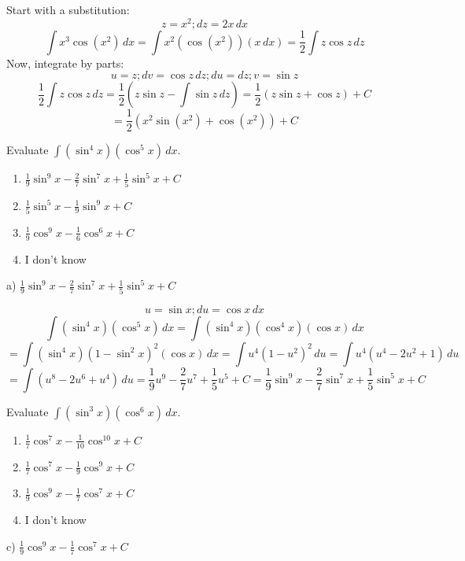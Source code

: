 \documentclass[addpoints,12pt,answers]{exam}
\begin{document}
\begin{questions}
\begin{solution}
    Start with a substitution:    
    $$z=x^2; dz=2x\,dx$$
    $$\int x^3\cos(x^2)\,dx=\int x^2(\cos (x^2))(x\,dx)=\frac{1}{2}\int z\cos z\,dz$$
    Now, integrate by parts:
    $$u=z; dv=\cos z\,dz; du=dz; v=\sin z$$
    $$\frac{1}{2}\int z\cos z\,dz=\frac{1}{2}\left(z\sin z-\int\sin z\,dz\right)=\frac{1}{2}(z\sin z+\cos z)+C$$
    $$=\frac{1}{2}\left(x^2\sin(x^2)+\cos(x^2)\right)+C$$
  \end{solution}
  \newpage
  \question
  Evaluate $\displaystyle\int(\sin^4 x)(\cos^5 x)\,dx$.
  \begin{enumerate}[label=\alph*)]
    \item
    $\displaystyle\frac{1}{9}\sin^9 x-\frac{2}{7}\sin^7 x+\frac{1}{5}\sin^5 x+C$
    \item
    $\displaystyle\frac{1}{5}\sin^5 x-\frac{1}{9}\sin^9 x+C$
    \item
    $\displaystyle\frac{1}{9}\cos^9 x-\frac{1}{6}\cos^6 x+C$
    \item
    I don't know
  \end{enumerate}
  \begin{solution}
    a) $\displaystyle\frac{1}{9}\sin^9 x-\frac{2}{7}\sin^7 x+\frac{1}{5}\sin^5 x+C$
    
    $$u=\sin x; du=\cos x\,dx$$
    $$\int(\sin^4 x)(\cos^5 x)\,dx=\int(\sin^4 x)(\cos^4 x)(\cos x)\,dx$$
    $$=\int(\sin^4 x)(1-\sin^2 x)^2(\cos x)\,dx=\int u^4(1-u^2)^2\,du=\int u^4(u^4-2u^2+1)\,du$$
    $$=\int(u^8-2u^6+u^4)\,du=\frac{1}{9}u^9-\frac{2}{7}u^7+\frac{1}{5}u^5+C=\frac{1}{9}\sin^9 x-\frac{2}{7}\sin^7 x+\frac{1}{5}\sin^5 x+C$$
  \end{solution}
  \newpage
  \question
  Evaluate $\displaystyle\int(\sin^3 x)(\cos^6 x)\,dx$.
  \begin{enumerate}[label=\alph*)]
    \item
    $\displaystyle\frac{1}{7}\cos^7 x-\frac{1}{10}\cos^{10}x+C$
    \item
    $\displaystyle\frac{1}{7}\cos^7 x-\frac{1}{9}\cos^9 x+C$
    \item
    $\displaystyle\frac{1}{9}\cos^9 x-\frac{1}{7}\cos^7 x+C$
    \item
    I don't know
  \end{enumerate}
  \begin{solution}
    c) $\displaystyle\frac{1}{9}\cos^9 x-\frac{1}{7}\cos^7 x+C$
    

\end{solution}
\end{questions}
\end{document}
